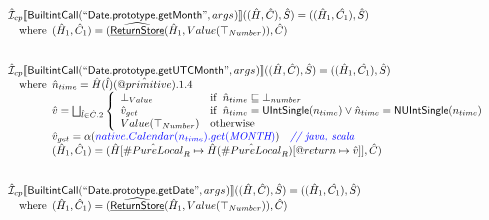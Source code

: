 \documentclass{article}
\makeatletter
\newcommand{\SF}[1]{\mbox{\textsf{#1}}}
\newcommand{\comment}[1]{\textit{#1}}
\newcommand{\wherec}[1]{{\rm where}\begin{array}[t]{l}#1\end{array}}
\newcommand{\ifc}[1]{{\rm if}\begin{array}[t]{l}#1\end{array}}
\newcommand{\owc}{{\rm otherwise}}
\newcommand{\aI}{\hat{\mathcal{I}}}
\newcommand{\lbr}{\llbracket}
\newcommand{\rbr}{\rrbracket}
\newcommand{\ahf}[1]{\widehat{\underline{\sf #1}}}
\newcommand{\varprop}[1]{@#1}
\newcommand{\avarloc}[1]{\hat{\##1}}
\newcommand{\avarprop}[1]{\hat{@#1}}
\def\inblue{\color{blue}}
\def\inblue{\color{blue}}
\makeatother
\begin{document}
\[
\begin{array}{l}
\aI _{cp}\lbr \SF{BuiltintCall}(``\SF{Date.prototype.getMonth}",args_{})\rbr((\hat{H},\hat{C}), \hat{S})
  = ((\hat{H}_1, \hat{C_1}), \hat{S})\\
\quad\wherec{
  (\hat{H}_1, \hat{C}_1) = (\ahf{ReturnStore}(\hat{H}_1, Value(\top_{Number})), \hat{C})
  }\\
\\\\

\aI _{cp}\lbr \SF{BuiltintCall}(``\SF{Date.prototype.getUTCMonth}",args_{})\rbr((\hat{H},\hat{C}), \hat{S})
  = ((\hat{H}_1, \hat{C_1}), \hat{S})\\
\quad\wherec{
  \hat{n}_{time} = \hat{H}(\hat{l})(\avarprop{primitive}).1.4\\
  \hat{v} = \bigsqcup_{\hat{l} \in \hat{C}.2} \left\{\begin{array}{ll}
      \bot_{Value} & \ifc{\hat{n}_{time} \sqsubseteq  \bot_{number}}\\
      \hat{v}_{get} &
      \ifc{\hat{n}_{time} = \SF{UIntSingle}(n_{time}) \lor\hat{n}_{time} = \SF{NUIntSingle}(n_{time}) }\\
      Value(\top_{Number}) & \owc
    \end{array}\right.\\
  \hat{v}_{get} = \alpha({\inblue native.Calendar(n_{time}).get(\emph{MONTH})})
    \quad\comment{{\inblue // java, scala}}\\  
  (\hat{H}_1, \hat{C}_1) = 
    (\hat{H}[\avarloc{PureLocal}_R \mapsto \hat{H}(\avarloc{PureLocal}_R)
      [\varprop{return} \mapsto \hat{v}]], \hat{C})\\
  }\\
\\\\

\aI _{cp}\lbr \SF{BuiltintCall}(``\SF{Date.prototype.getDate}",args_{})\rbr((\hat{H},\hat{C}), \hat{S})
  = ((\hat{H}_1, \hat{C_1}), \hat{S})\\
\quad\wherec{
  (\hat{H}_1, \hat{C}_1) = (\ahf{ReturnStore}(\hat{H}_1, Value(\top_{Number})), \hat{C})
  }\\
\\\\



\end{array}\]
\end{document}
